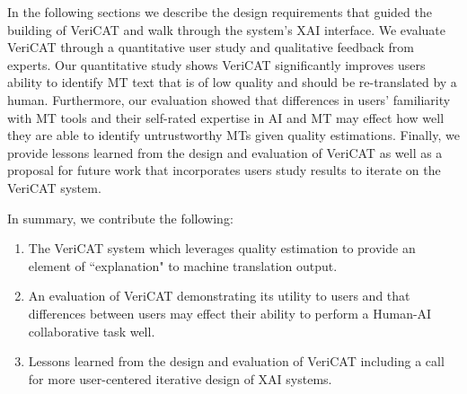 In the following sections we describe the design requirements that guided the building of VeriCAT and walk through the system's XAI interface. We evaluate VeriCAT through a quantitative user study and qualitative feedback from experts. Our quantitative study shows VeriCAT significantly improves users ability to identify MT text that is of low quality and should be re-translated by a human. Furthermore, our evaluation showed that differences in users' familiarity with MT tools and their self-rated expertise in AI and MT may effect how well they are able to identify untrustworthy MTs given quality estimations. Finally, we provide lessons learned from the design and evaluation of VeriCAT as well as a proposal for future work that incorporates users study results to iterate on the VeriCAT system.

In summary, we contribute the following: 
\begin{enumerate}
    \item The VeriCAT system which leverages quality estimation to provide an element of ``explanation" to machine translation output. 
    \item An evaluation of VeriCAT demonstrating its utility to users and that differences between users may effect their ability to perform a Human-AI collaborative task well.
    \item Lessons learned from the design and evaluation of VeriCAT including a call for more user-centered iterative design of XAI systems. 
\end{enumerate}
